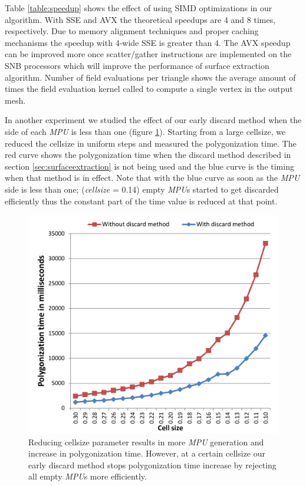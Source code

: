 Table \ref{table:speedup} shows the effect of using SIMD optimizations in our algorithm. With SSE and AVX the theoretical speedups are 4 and 8 times, 
respectively. Due to memory alignment techniques and proper caching mechanisms the speedup with 4-wide SSE is greater than 4. The AVX speedup can be 
improved more once scatter/gather instructions are implemented on the SNB processors which will improve the performance of surface extraction algorithm.
Number of field evaluations per triangle shows the average amount of times the field evaluation kernel called to compute a single vertex in the output mesh. 

In another experiment we studied the effect of our early discard method when the side of each \textit{MPU} is less than one 
(figure \ref{fig:DiscardEffect}). Starting from a large cellsize, we reduced the cellsize in uniform steps and measured the polygonization time. 
The red curve shows the polygonization time when the discard method described in section \ref{sec:surfaceextraction} is not being used and the blue curve 
is the timing when that method is in effect. Note that with the blue curve as soon as the \textit{MPU} side is less than one; (\textit{cellsize} = 0.14) empty 
\textit{MPU}s started to get discarded efficiently thus the constant part of the time value is reduced at that point.

\begin{figure}[htb]
  \centering
  \includegraphics[width = 1.0\linewidth]{figures/cpupoly/DiscardEffect2.pdf}
  \caption{\label{fig:DiscardEffect}
  {Reducing cellsize parameter results in more \textit{MPU} generation and increase in polygonization time.
  However, at a certain cellsize our early discard method stops polygonization time increase by rejecting 
  all empty \textit{MPU}s more efficiently.}
}
\end{figure}



